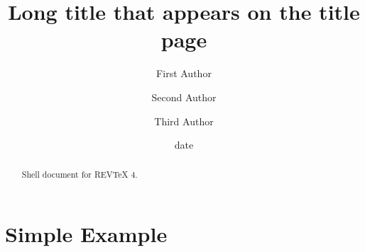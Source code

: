 \documentclass[aps,preprint]{revtex4}%
\begin{document}
\title[Short title for running header]{Long title that appears on the title page}
\author{First Author}
\author{Second Author}
\author{Third Author}

\begin{abstract}
Shell document for REV\TeX{} 4.

\end{abstract}
\date[Date text]{date}




\maketitle
\tableofcontents


\section{Simple Example}
\end{document}
